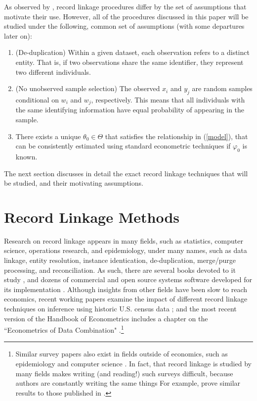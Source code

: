 \documentclass[12pt]{article}
\begin{document}
As observed by \cite{bailey2017}, record linkage procedures differ by the set of assumptions that motivate their use.  However, all of the procedures discussed in this paper will be studied under the following, common set of assumptions (with some departures later on):
\begin{enumerate}
\item (De-duplication) Within a given dataset, each observation refers to a distinct entity.  That is, if two observations share the same identifier, they represent two different individuals.
\item (No unobserved sample selection) The observed $x_i$ and $y_j$ are random samples conditional on $w_i$ and $w_j$, respectively.  This means that all individuals with the same identifying information have equal probability of appearing in the sample. 
\item There exists a unique $\theta_0 \in \Theta$ that satisfies the relationship in (\ref{model}), that can be consistently estimated using standard econometric techniques if $\varphi_0$ is known.
\end{enumerate}

The next section discusses in detail the exact record linkage techniques that will be studied, and their motivating assumptions.


\section{Record Linkage Methods}

Research on record linkage appears in many fields, such as statistics, computer science, operations research, and epidemiology, under many names, such as data linkage, entity resolution, instance identication, de-duplication, merge/purge processing, and reconciliation.  As such, there are several books devoted to it study \citep{harron_book, christen2012, herzog07}, and dozens of commercial and open source systems software developed for its implementation \citep{kopcke2010}.  Although insights from other fields have been slow to reach economics, recent working papers examine the impact of different record linkage techniques on inference using historic U.S. census data \citep{abe2019, bailey2017}; and the most recent version of the Handbook of Econometrics includes a chapter on the ``Econometrics of Data Combination" \citep{RidderMoffitt}.\footnote{Similar survey papers also exist in fields outside of economics, such as epidemiology and computer science \citep{harron2018, winkler99}.  In fact, that record linkage is studied by many fields makes writing (and reading!) such surveys difficult, because authors are constantly writing the same things For example, \cite{Goldstein2012} prove similar results to those published in \cite{hirukawa2018}.}
\end{document}

